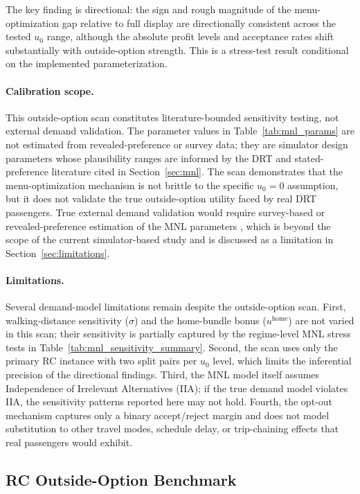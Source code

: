 The key finding is directional: the sign and rough magnitude of the menu-optimization gap relative to full display are directionally consistent across the tested $u_0$ range, although the absolute profit levels and acceptance rates shift substantially with outside-option strength. This is a stress-test result conditional on the implemented parameterization.

\paragraph{Calibration scope.}
This outside-option scan constitutes literature-bounded sensitivity testing, not external demand validation. The parameter values in Table~\ref{tab:mnl_params} are not estimated from revealed-preference or survey data; they are simulator design parameters whose plausibility ranges are informed by the DRT and stated-preference literature cited in Section~\ref{sec:mnl}. The scan demonstrates that the menu-optimization mechanism is not brittle to the specific $u_0 = 0$ assumption, but it does not validate the true outside-option utility faced by real DRT passengers. True external demand validation would require survey-based or revealed-preference estimation of the MNL parameters \citep{ben1985discrete}, which is beyond the scope of the current simulator-based study and is discussed as a limitation in Section~\ref{sec:limitations}.

\paragraph{Limitations.}
Several demand-model limitations remain despite the outside-option scan. First, walking-distance sensitivity ($\sigma$) and the home-bundle bonus ($u^{\text{home}}$) are not varied in this scan; their sensitivity is partially captured by the regime-level MNL stress tests in Table~\ref{tab:mnl_sensitivity_summary}. Second, the scan uses only the primary RC instance with two split pairs per $u_0$ level, which limits the inferential precision of the directional findings. Third, the MNL model itself assumes Independence of Irrelevant Alternatives (IIA); if the true demand model violates IIA, the sensitivity patterns reported here may not hold. Fourth, the opt-out mechanism captures only a binary accept/reject margin and does not model substitution to other travel modes, schedule delay, or trip-chaining effects that real passengers would exhibit.

\subsection{RC Outside-Option Benchmark}


